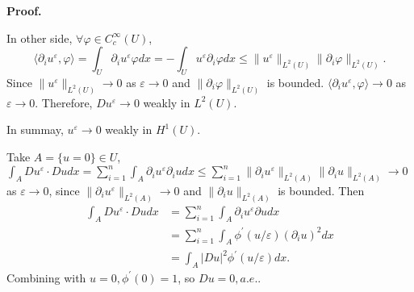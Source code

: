 \documentclass[a4paper]{book}
\newenvironment{eproof}
{\noindent\textbf{Proof.}}
{\qedhere}
\numberwithin{equation}{chapter}
\theoremstyle{definition}
\begin{document}
\begin{eproof}
\begin{itemize}
    In other side, $\forall \varphi \in C^\infty_c(U)$,
    \[\langle \partial_i u^\varepsilon, \varphi \rangle = \int_U \partial_i u^\varepsilon \varphi dx
      = - \int_U u^\varepsilon \partial_i \varphi dx \leq \|u^\varepsilon \|_{L^2(U)} \| \partial_i \varphi \|_{L^2(U)}. \]
    Since $\|u^\varepsilon \|_{L^2(U)} \rightarrow 0$ as $\varepsilon \rightarrow 0$ and $\|\partial_i \varphi \|_{L^2(U)}$ is bounded. $\langle \partial_i u^\varepsilon, \varphi \rangle \rightarrow 0$ as $\varepsilon \rightarrow 0$. Therefore, $Du^\varepsilon \rightarrow 0$ weakly in $L^2(U)$.
  \end{itemize}

  In summay, $u^\varepsilon \rightarrow 0$ weakly in $H^1(U)$.

  Take $A = \{u = 0\} \in U$, $\int_A Du^\varepsilon \cdot Du dx = \sum_{i=1}^n \int_A \partial_i u^\varepsilon \partial_i u dx  \leq \sum_{i=1}^n \| \partial_i u^\varepsilon \|_{L^2(A)} \| \partial_i u \|_{L^2(A)} \rightarrow 0$ as $\varepsilon \rightarrow 0$, since $\| \partial_i u^\varepsilon \|_{L^2(A)} \rightarrow 0$ and $\| \partial_i u \|_{L^2(A)}$ is bounded.
  Then
  \begin{align*}
    \int_A Du^\varepsilon \cdot Du dx &= \sum_{i=1}^n \int_A \partial_i u^\varepsilon \partial u dx \\
                                      &= \sum_{i=1}^n \int_A \phi^\prime(u/\varepsilon) (\partial_i u)^2dx \\
                                      &= \int_A \left| Du \right|^2 \phi^\prime(u/\varepsilon) dx.
  \end{align*}
  Combining with $u = 0, \phi^\prime(0) = 1$, so $Du = 0, a.e. $.

\end{eproof}
\end{document}
